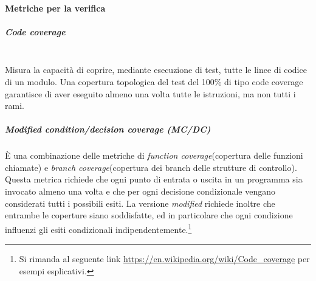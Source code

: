 \paragraph{Metriche per la verifica}\mbox{}
\subparagraph{Code coverage}\mbox{}\\
Misura la capacità di coprire, mediante esecuzione di test, tutte le linee di codice di un modulo. Una copertura topologica del test del 100\% di tipo code coverage garantisce di aver eseguito almeno una volta tutte le istruzioni, ma non tutti i rami.

\subparagraph{Modified condition/decision coverage (MC/DC)}
\`{E} una combinazione delle metriche di \textit{function coverage}(copertura delle funzioni chiamate) e \textit{branch coverage}(copertura dei branch delle strutture di controllo). Questa metrica richiede che ogni punto di entrata o uscita in un programma sia invocato almeno una volta e che per ogni decisione condizionale vengano considerati tutti i possibili esiti. La versione \textit{modified} richiede inoltre che entrambe le coperture siano soddisfatte, ed in particolare che ogni condizione influenzi gli esiti condizionali indipendentemente.\footnote{Si rimanda al seguente link \url{https://en.wikipedia.org/wiki/Code_coverage} per esempi esplicativi.}

